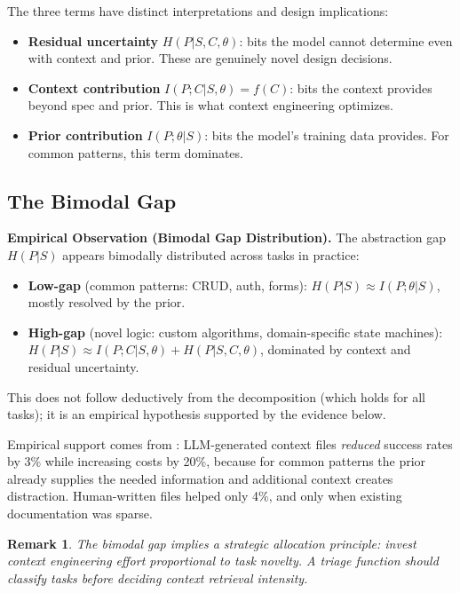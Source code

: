 \documentclass[11pt, a4paper, logo, copyright]{googledeepmind}
\newtheorem*{remark}{Remark}
\begin{document}
The three terms have distinct interpretations and design implications:

\begin{itemize}[nosep]
    \item \textbf{Residual uncertainty} $H(P|S,C,\theta)$: bits the model cannot determine even with context and prior. These are genuinely novel design decisions.
    \item \textbf{Context contribution} $I(P;C|S,\theta) = f(C)$: bits the context provides beyond spec and prior. This is what context engineering optimizes.
    \item \textbf{Prior contribution} $I(P;\theta|S)$: bits the model's training data provides. For common patterns, this term dominates.
\end{itemize}

\subsection{The Bimodal Gap}
\label{sec:bimodal}

\noindent\textbf{Empirical Observation (Bimodal Gap Distribution).}
\label{cor:bimodal}
The abstraction gap $H(P|S)$ appears bimodally distributed across tasks in practice:
\begin{itemize}[nosep]
    \item \textbf{Low-gap} (common patterns: CRUD, auth, forms): $H(P|S) \approx I(P;\theta|S)$, mostly resolved by the prior.
    \item \textbf{High-gap} (novel logic: custom algorithms, domain-specific state machines): $H(P|S) \approx I(P;C|S,\theta) + H(P|S,C,\theta)$, dominated by context and residual uncertainty.
\end{itemize}
This does not follow deductively from the decomposition (which holds for all tasks); it is an empirical hypothesis supported by the evidence below.

Empirical support comes from \citet{gloaguen2026agents}: LLM-generated context files \emph{reduced} success rates by 3\% while increasing costs by 20\%, because for common patterns the prior already supplies the needed information and additional context creates distraction. Human-written files helped only 4\%, and only when existing documentation was sparse.

\begin{remark}
The bimodal gap implies a strategic allocation principle: invest context engineering effort proportional to task novelty. A triage function should classify tasks before deciding context retrieval intensity.
\end{remark}
\end{document}
